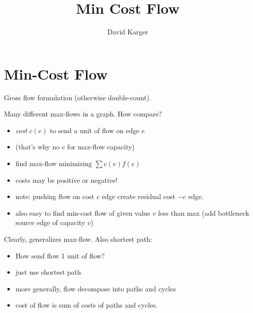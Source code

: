 \documentclass{article}
\title{Min Cost Flow}
\author{David Karger}
\begin{document}
  \section*{Min-Cost Flow}

  Gross flow formulation (otherwise double-count).

  Many different max-flows in a graph.  How compare?
  \begin{itemize}
  \item {\em cost} $c(e)$ to send a unit of flow on edge $e$
  \item (that's why no $c$ for max-flow capacity)
  \item find max-flow minimizing $\sum c(e)f(e)$
  \item costs may be positive or negative!
  \item note: pushing flow on cost $c$ edge create residual cost $-c$
    edge.
  \item also easy to find min-cost flow of given value $v$ less than max
    (add bottleneck source edge of capacity $v$)
  \end{itemize}

  Clearly, generalizes max-flow.  Also shortest path:
  \begin{itemize}
  \item How send flow 1 unit of flow?
  \item just use shortest path
  \item more generally, flow decompose into paths and cycles
  \item cost of flow is sum of costs of paths and cycles.
  \end{itemize}

\end{document}
